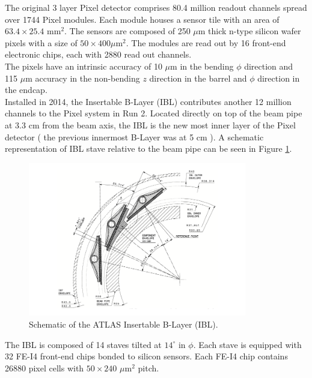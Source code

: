 \indent The original 3 layer Pixel detector comprises 80.4 million readout channels spread over 1744 Pixel modules.  Each module houses a sensor tile with an area of $63.4 \times 25.4$ mm$^2$.  The sensors are composed of 250 $\mu$m thick n-type silicon wafer pixels with a size of $50\times400 \mu$m$^2$. The modules are read out by 16 front-end electronic chips, each with 2880 read out channels. \\

\indent The pixels have an intrinsic accuracy of 10 $\mu$m in the bending $\phi$ direction and 115 $\mu$m accuracy in the non-bending $z$ direction in the barrel and $\phi$ direction in the endcap.\\ 

\indent Installed in 2014, the Insertable B-Layer (IBL) contributes another 12 million channels to the Pixel system in Run 2.\cite{IBLOverview,IBL_TDR}  Located directly on top of the beam pipe at 3.3 cm from the beam axis, the IBL is the new most inner layer of the Pixel detector ( the previous innermost B-Layer was at 5 cm ). A schematic representation of IBL stave relative to the beam pipe can be seen in Figure \ref{LHC:fig:IBL}. \\

\begin{figure}[h!]
\centering
\includegraphics[width=0.85\textwidth, angle=0]{figures/LHC_ATLAS/fig_ibl_layout_rev.png}
\caption[~Schematic of the ATLAS Insertable B-Layer (IBL)]{ Schematic of the ATLAS Insertable B-Layer (IBL).\cite{IBLOverview} \label{LHC:fig:IBL}}
\end{figure}

\indent The IBL is composed of 14 staves tilted at $14^{\circ}$ in $\phi$.  Each stave is equipped with 32 FE-I4 front-end chips bonded to silicon sensors. Each FE-I4 chip contains 26880 pixel cells with $50 \times 240$ $\mu$m$^2$ pitch.\\

